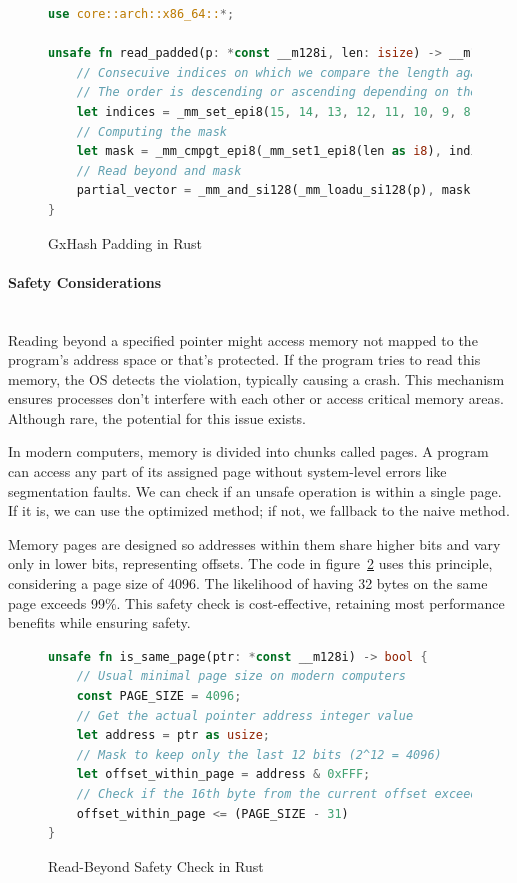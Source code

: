 \documentclass[10pt]{article}
\begin{document}
\begin{figure}[H]
\begin{lstlisting}[language=Rust, style=boxed]
use core::arch::x86_64::*;

unsafe fn read_padded(p: *const __m128i, len: isize) -> __m128i {
    // Consecuive indices on which we compare the length against, byte per byte, to retreive our mask.
    // The order is descending or ascending depending on the endianness
    let indices = _mm_set_epi8(15, 14, 13, 12, 11, 10, 9, 8, 7, 6, 5, 4, 3, 2, 1, 0);
    // Computing the mask
    let mask = _mm_cmpgt_epi8(_mm_set1_epi8(len as i8), indices);
    // Read beyond and mask
    partial_vector = _mm_and_si128(_mm_loadu_si128(p), mask);
}
\end{lstlisting}
\caption{GxHash Padding in Rust}
\label{fig:read_beyond_example}
\end{figure}

\paragraph{Safety Considerations}\leavevmode\\
Reading beyond a specified pointer might access memory not mapped to the program's address space or that's protected. If the program tries to read this memory, the OS detects the violation, typically causing a crash. This mechanism ensures processes don't interfere with each other or access critical memory areas. Although rare, the potential for this issue exists.

In modern computers, memory is divided into chunks called pages. A program can access any part of its assigned page without system-level errors like segmentation faults. We can check if an unsafe operation is within a single page. If it is, we can use the optimized method; if not, we fallback to the naive method.

Memory pages are designed so addresses within them share higher bits and vary only in lower bits, representing offsets. The code in figure~\ref{fig:check_page_example} uses this principle, considering a page size of 4096. The likelihood of having 32 bytes on the same page exceeds 99\%. This safety check is cost-effective, retaining most performance benefits while ensuring safety.

\begin{figure}[H]
\begin{lstlisting}[language=Rust, style=boxed]
unsafe fn is_same_page(ptr: *const __m128i) -> bool {
    // Usual minimal page size on modern computers
    const PAGE_SIZE = 4096;
    // Get the actual pointer address integer value
    let address = ptr as usize;
    // Mask to keep only the last 12 bits (2^12 = 4096)
    let offset_within_page = address & 0xFFF;
    // Check if the 16th byte from the current offset exceeds the page boundary
    offset_within_page <= (PAGE_SIZE - 31)
}
\end{lstlisting}
\caption{Read-Beyond Safety Check in Rust}
\label{fig:check_page_example}
\end{figure}
\end{document}
